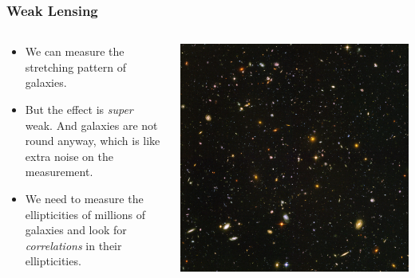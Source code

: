 \documentclass{beamer}
\begin{document}
\frame
{

    \frametitle{Weak Lensing}


    \begin{columns}
        \begin{column}{0.5\textwidth}
            \begin{itemize}

                \item We can measure the stretching pattern of galaxies.                   

                \item But the effect is {\em super} weak.  And galaxies are
                    not round anyway, which is like extra noise on the measurement.

                \item  We need to measure the ellipticities of millions of galaxies
                    and look for {\em correlations} in their ellipticities.

            \end{itemize}
        \end{column}
        \begin{column}{0.5\textwidth}
            \begin{center}
                \includegraphics[width=\textwidth]{UDF_half.jpg}
            \end{center}

            
        \end{column}
    \end{columns}
}
\end{document}
